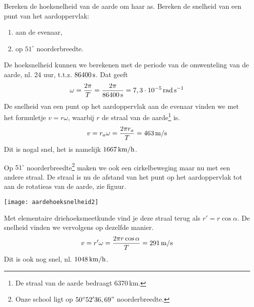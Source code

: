 \documentclass{ximera}
\begin{document}
\begin{exercise}
	Bereken de hoeksnelheid van de aarde om haar as. Bereken de snelheid van een punt van het aardoppervlak:
	\begin{enumerate}
		\item aan de evenaar,
		\item op $51^\circ$ noorderbreedte.
	\end{enumerate}
	\begin{oplossing}
		De hoeksnelheid kunnen we berekenen met de periode van de omwenteling van de aarde, nl. 24 uur, t.t.z. $86400\rm\,s$. Dat geeft
		\begin{eqnarray*}
			\omega=\frac{2\pi}{T}=\frac{2\pi}{86400\rm\,s}=7,3\cdot10^{-5}\rm\,rad\,s^{-1}
		\end{eqnarray*}
		De snelheid van een punt op het aardoppervlak aan de evenaar vinden we met het formuletje $v=r\omega$, waarbij $r$ de straal van de aarde\footnote{De straal van de aarde bedraagt 6370\rm\,km.} is.
		\begin{eqnarray*}
		v=r_a\omega=\frac{2\pi r_a}{T}=463\rm\,m/s
		\end{eqnarray*}
		Dit is nogal snel, het is namelijk $1667\rm\,km/h$.

		Op $51^\circ$ noorderbreedte\footnote{Onze school ligt op $50^\circ 52'36,69"$ noorderbreedte.} maken we ook een cirkelbeweging maar nu met een andere straal. De straal is nu de afstand van het punt op het aardoppervlak tot aan de rotatieas van de aarde, zie figuur. 
		\begin{image}
		\texttt{[image: aardehoeksnelheid2]}
		\end{image}
		Met elementaire driehoeksmeetkunde vind je deze straal terug als $r'=r\cos\alpha$. De snelheid vinden we vervolgens op dezelfde manier.
		\begin{eqnarray*}
		v=r'\omega=\frac{2\pi r\cos\alpha}{T}=291\rm\,m/s
		\end{eqnarray*}
		Dit is ook nog snel, nl. $1048\rm\,km/h$.
	\end{oplossing}
\end{exercise}
\end{document}
